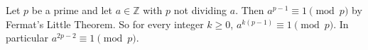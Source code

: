 Let $p$ be a prime and let $a \in \mathbb{Z}$ with $p$ not dividing $a$.
Then $a^{p - 1} \equiv 1 \pmod{p}$ by Fermat's Little Theorem.
So for every integer $k \geq 0$, $a^{k(p - 1)} \equiv 1 \pmod{p}$.
In particular $a^{2p - 2} \equiv 1 \pmod{p}$.